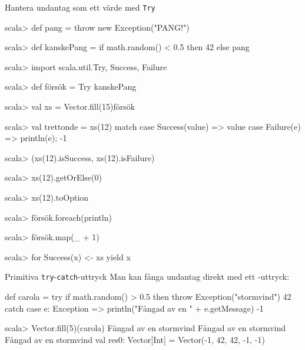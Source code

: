 \begin{Slide}{Hantera undantag som ett värde med \texttt{Try}}
\vspace{-0.5em}\begin{REPLsmall}
scala> def pang = throw new Exception("PANG!")

scala> def kanskePang = if math.random() < 0.5 then 42 else pang

scala> import scala.util.{Try, Success, Failure}

scala> def försök = Try { kanskePang }

scala> val xs = Vector.fill(15){försök}

scala> val trettonde = xs(12) match
         case Success(value) => value
         case Failure(e) => println(e); -1

scala> (xs(12).isSuccess, xs(12).isFailure) 

scala> xs(12).getOrElse(0)

scala> xs(12).toOption

scala> försök.foreach(println)

scala> försök.map(_ + 1)

scala> for Success(x) <- xs yield x
\end{REPLsmall}
\end{Slide}



\begin{Slide}{Primitiva \texttt{try}-\texttt{catch}-uttryck}\SlideFontSmall
Man kan fånga undantag direkt med ett -uttryck:
\begin{Code}
def carola = 
  try 
    if math.random() > 0.5 then throw Exception("stormvind")
    42
  catch 
    case e: Exception =>
      println("Fångad av en " + e.getMessage)
      -1

\end{Code}
\pause
\begin{REPL}
scala> Vector.fill(5)(carola)
Fångad av en stormvind
Fångad av en stormvind
Fångad av en stormvind
val res0: Vector[Int] = Vector(-1, 42, 42, -1, -1)
\end{REPL}
\end{Slide}


